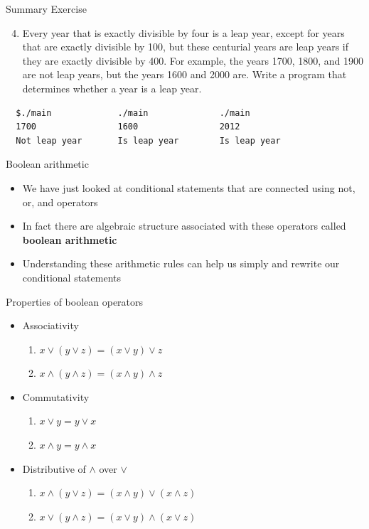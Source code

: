 \documentclass[10pt,xcolor={table,dvipsnames},t]{beamer}
\begin{document}
\begin{frame}[fragile]{Summary Exercise}
  \begin{enumerate}
    \setcounter{enumi}{3}
    \item Every year that is exactly divisible by four is a leap year, except for years that are exactly divisible by 100, but these centurial years are leap years if they are exactly divisible by 400. For example, the years 1700, 1800, and 1900 are not leap years, but the years 1600 and 2000 are. Write a program that determines whether a year is a leap year.
  \end{enumerate}
\begin{lstlisting}
  $./main             ./main              ./main
  1700                1600                2012
  Not leap year       Is leap year        Is leap year
\end{lstlisting}
\end{frame}

\begin{frame}{Boolean arithmetic}
  \begin{itemize}
    \item We have just looked at conditional statements that are connected using not, or, and operators
    \item In fact there are algebraic structure associated with these operators called \textbf{boolean arithmetic}
    \item Understanding these arithmetic rules can help us simply and rewrite our conditional statements
  \end{itemize}
\end{frame}

\begin{frame}{Properties of boolean operators}
  \begin{itemize}
    \item Associativity
    \begin{enumerate}
      \item $x\lor (y\lor z) = (x\lor y) \lor z$
      \item $x\land (y\land z) = (x\land y) \land z$
    \end{enumerate}
    \item Commutativity
    \begin{enumerate}
      \item $x\lor y = y \lor x$
      \item $x\land y  = y\land x$
    \end{enumerate}
    \item Distributive of $\land$ over $\lor$
    \begin{enumerate}
      \item $x \land (y\lor z) = (x \land y) \lor (x \land z)$\\
      \item $x \lor (y\land z) = (x\lor y) \land (x\lor z)$
    \end{enumerate}
  \end{itemize}
\end{frame}
\end{document}
